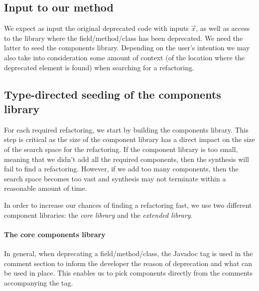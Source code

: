 \documentclass[runningheads,a4paper]{llncs}
\begin{document}
\subsection{{\bf Input to our method}}
We expect as input the original deprecated code  with inputs
$\vec{x}$, as well as access to the library where the
field/method/class has been deprecated. We need the latter to seed the
components library.  Depending on the user's intention we may also
take into consideration some amount of context (of the location where
the deprecated element is found) when searching for a refactoring.

\subsection{{\bf Type-directed seeding of the components library}}
For each required refactoring, we start by building the components library.
This step is critical as the size of the component library has a direct impact
on the size of the search space for the refactoring.
If the component library is too small, meaning that we didn't add all
the required components, then the synthesis will fail to find a refactoring.
However, if we add too many components, then the search space becomes too vast and
synthesis may not terminate within a reasonable amount of time.

In order to increase our chances of finding a refactoring fast, we use two different
component libraries: the {\em core library} and the {\em extended library}. 

\paragraph{The core components library}
In general, when deprecating a field/method/class, the
 Javadoc tag is used in the comment section to
inform the developer the reason of deprecation and what can be used in
place. This enables us to pick components directly from the comments accompanying the
 tag.

\end{document}
